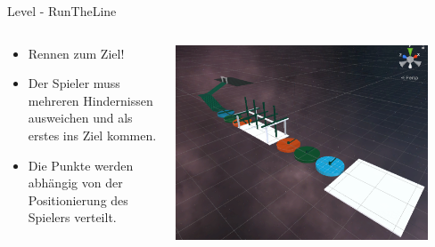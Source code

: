 \documentclass[xcolor=dvipsnames]{beamer}
\begin{document}
\begin{frame}{Level - RunTheLine}
\begin{columns}
\begin{column}{0.5\textwidth}
	\begin{itemize}
		\item Rennen zum Ziel!
		\item Der Spieler muss mehreren Hindernissen ausweichen und als erstes ins Ziel kommen.
		\item Die Punkte werden abhängig von der Positionierung des Spielers verteilt.
	\end{itemize}
\end{column}
\begin{column}{0.5\textwidth} 
	\begin{center}
		\includegraphics[width=0.9\textwidth]{Level_RunTheLine_view.png}
	\end{center}
\end{column}
\end{columns}

\end{frame}
\end{document}
